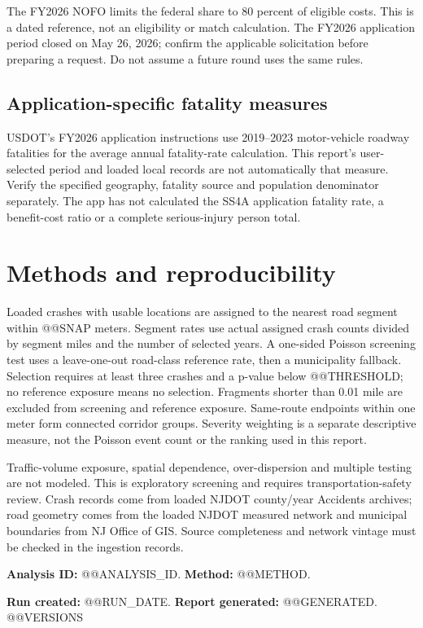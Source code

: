 \documentclass[10pt,letterpaper]{article}
\begin{document}
The FY2026 NOFO limits the federal share to 80 percent of eligible costs.\cite{nofo}
This is a dated reference, not an eligibility or match calculation. The FY2026
application period closed on May 26, 2026; confirm the applicable solicitation
before preparing a request. Do not assume a future round uses the same rules.

\subsection{Application-specific fatality measures}
USDOT's FY2026 application instructions use 2019--2023 motor-vehicle roadway
fatalities for the average annual fatality-rate calculation.\cite{fatalityrate}
This report's user-selected period and loaded local records are not automatically
that measure. Verify the specified geography, fatality source and population
denominator separately. The app has not calculated the SS4A application fatality
rate, a benefit-cost ratio or a complete serious-injury person total.

\clearpage
\section{Methods and reproducibility}
Loaded crashes with usable locations are assigned to the nearest road segment
within @@SNAP meters. Segment rates use actual assigned crash counts divided by
segment miles and the number of selected years. A one-sided Poisson screening test
uses a leave-one-out road-class reference rate, then a municipality fallback.
Selection requires at least three crashes and a p-value below @@THRESHOLD; no
reference exposure means no selection. Fragments shorter than 0.01 mile are excluded
from screening and reference exposure. Same-route endpoints within one meter form
connected corridor groups. Severity weighting is a separate descriptive measure,
not the Poisson event count or the ranking used in this report.

Traffic-volume exposure, spatial dependence, over-dispersion and multiple testing
are not modeled. This is exploratory screening and requires transportation-safety
review. Crash records come from loaded NJDOT county/year Accidents archives;
road geometry comes from the loaded NJDOT measured network and municipal boundaries
from NJ Office of GIS. Source completeness and network vintage must be checked in
the ingestion records.

\textbf{Analysis ID:} @@ANALYSIS_ID. \textbf{Method:} @@METHOD.\par
\textbf{Run created:} @@RUN_DATE. \textbf{Report generated:} @@GENERATED.
@@VERSIONS
\end{document}
